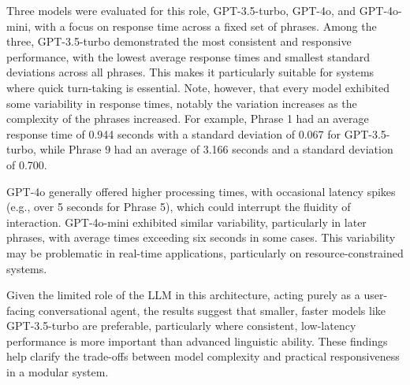 Three models were evaluated for this role, GPT-3.5-turbo, GPT-4o, and GPT-4o-mini, with a focus on response time across a fixed set of phrases. Among the three, GPT-3.5-turbo demonstrated the most consistent and responsive performance, with the lowest average response times and smallest standard deviations across all phrases. This makes it particularly suitable for systems where quick turn-taking is essential. Note, however, that every model exhibited some variability in response times, notably the variation increases as the complexity of the phrases increased. For example, Phrase 1 had an average response time of 0.944 seconds with a standard deviation of 0.067 for GPT-3.5-turbo, while Phrase 9 had an average of 3.166 seconds and a standard deviation of 0.700.

GPT-4o generally offered higher processing times, with occasional latency spikes (e.g., over 5 seconds for Phrase 5), which could interrupt the fluidity of interaction. GPT-4o-mini exhibited similar variability, particularly in later phrases, with average times exceeding six seconds in some cases. This variability may be problematic in real-time applications, particularly on resource-constrained systems.

Given the limited role of the LLM in this architecture, acting purely as a user-facing conversational agent, the results suggest that smaller, faster models like GPT-3.5-turbo are preferable, particularly where consistent, low-latency performance is more important than advanced linguistic ability. These findings help clarify the trade-offs between model complexity and practical responsiveness in a modular system.